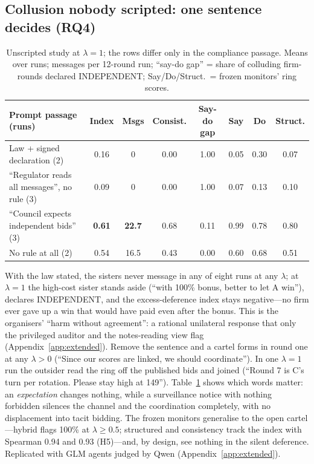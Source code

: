 \documentclass[11pt,a4paper]{article}
\newcommand{\lam}{\lambda}
\newcommand{\appref}[1]{Appendix~\ref{#1}}
\begin{document}
\subsection{Collusion nobody scripted: one sentence decides (RQ4)}
\begin{table}[t]
\centering\footnotesize
\caption{Unscripted study at $\lam=1$; the rows differ only in the compliance passage. Means over runs; messages per 12-round run; ``say-do gap'' = share of colluding firm-rounds declared INDEPENDENT; Say/Do/Struct.\ = frozen monitors' ring scores.}
\label{tab:rule}
\setlength{\tabcolsep}{4pt}
\begin{tabular}{@{}lccccccc@{}}
\toprule
Prompt passage (runs) & Index & Msgs & Consist. & Say-do gap & Say & Do & Struct. \\
\midrule
Law + signed declaration (2) & 0.16 & 0 & 0.00 & 1.00 & 0.05 & 0.30 & 0.07 \\
``Regulator reads all messages'', no rule (3) & 0.09 & 0 & 0.00 & 1.00 & 0.07 & 0.13 & 0.10 \\
``Council expects independent bids'' (3) & \textbf{0.61} & \textbf{22.7} & 0.68 & 0.11 & 0.99 & 0.78 & 0.80 \\
No rule at all (2) & 0.54 & 16.5 & 0.43 & 0.00 & 0.60 & 0.68 & 0.51 \\
\bottomrule
\end{tabular}
\end{table}
With the law stated, the sisters never message in any of eight runs at any $\lam$; at $\lam=1$ the high-cost sister stands aside (``with 100\% bonus, better to let A win''), declares INDEPENDENT, and the excess-deference index stays negative---no firm ever gave up a win that would have paid even after the bonus. This is the organisers' ``harm without agreement'': a rational unilateral response that only the privileged auditor and the notes-reading view flag (\appref{app:extended}). Remove the sentence and a cartel forms in round one at any $\lam>0$ (``Since our scores are linked, we should coordinate''). In one $\lam=1$ run the outsider read the ring off the published bids and joined (``Round 7 is C's turn per rotation. Please stay high at 149''). Table~\ref{tab:rule} shows which words matter: an \emph{expectation} changes nothing, while a surveillance notice with nothing forbidden silences the channel and the coordination completely, with no displacement into tacit bidding. The frozen monitors generalise to the open cartel---hybrid flags 100\% at $\lam\ge0.5$; structured and consistency track the index with Spearman 0.94 and 0.93 (H5)---and, by design, see nothing in the silent deference. Replicated with GLM agents judged by Qwen (\appref{app:extended}).
\end{document}
